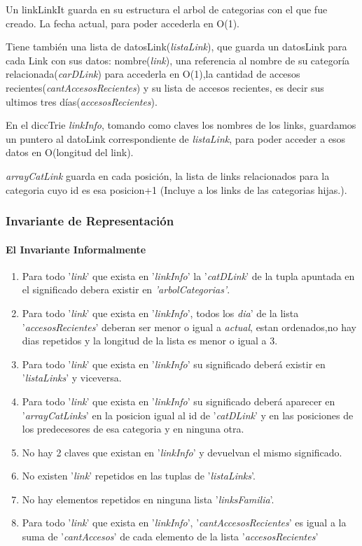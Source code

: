 \par Un linkLinkIt guarda en su estructura el arbol de categorias con el que fue creado. La fecha actual, para poder accederla en O(1).
\par Tiene también una lista de datosLink(\textit{listaLink}), que guarda un datosLink para cada Link con sus datos: nombre(\textit{link}), una referencia al nombre de su categoría relacionada(\textit{carDLink}) para accederla en O(1),la cantidad de accesos recientes(\textit{cantAccesosRecientes}) y su lista de accesos recientes, es decir sus ultimos tres días(\textit{accesosRecientes}).
\par En el diccTrie \textit{linkInfo}, tomando como claves los nombres de los links, guardamos un puntero al datoLink correspondiente de \textit{listaLink}, para poder acceder a esos datos en O(longitud del link).
\par \textit{arrayCatLink} guarda en cada posición, la lista de links relacionados para la categoria cuyo id es esa posicion+1 (Incluye a los links de las categorias hijas.).

\subsubsection{Invariante de Representaci\'on}
\paragraph{El Invariante Informalmente}
\begin{enumerate}
\item Para todo '\textit{link}' que exista en '\textit{linkInfo}' la '\textit{catDLink}' de la tupla apuntada en el significado debera existir en \textit{'arbolCategorias'}.
\item Para todo '\textit{link}' que exista en '\textit{linkInfo}', todos los \textit{dia}' de la lista '\textit{accesosRecientes}' deberan ser menor o igual a \textit{actual}, estan ordenados,no hay dias repetidos y la longitud de la lista es menor o igual a 3.
\item Para todo '\textit{link}' que exista en '\textit{linkInfo}' su significado deberá existir en '\textit{listaLinks}' y viceversa.
\item Para todo '\textit{link}' que exista en '\textit{linkInfo}' su significado deberá aparecer en '\textit{arrayCatLinks}' en la posicion igual al id de '\textit{catDLink}' y en las posiciones de los predecesores de esa categoria y en ninguna otra.
\item No hay 2 claves que existan en '\textit{linkInfo}' y devuelvan el mismo significado.
\item No existen '\textit{link}' repetidos en las tuplas de  '\textit{listaLinks}'.
\item No hay elementos repetidos en ninguna lista '\textit{linksFamilia}'.
\item Para todo '\textit{link}' que exista en '\textit{linkInfo}', '\textit{cantAccesosRecientes}' es igual a la suma de '\textit{cantAccesos}' de cada elemento de la lista '\textit{accesosRecientes}'
\end{enumerate}

